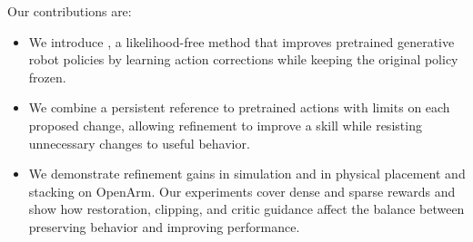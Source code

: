 Our contributions are:
\begin{itemize}
\item We introduce \method{}, a likelihood-free method that improves pretrained generative robot policies by learning action corrections while keeping the original policy frozen.
\item We combine a persistent reference to pretrained actions with limits on each proposed change, allowing refinement to improve a skill while resisting unnecessary changes to useful behavior.
\item We demonstrate refinement gains in simulation and in physical placement and stacking on OpenArm. Our experiments cover dense and sparse rewards and show how restoration, clipping, and critic guidance affect the balance between preserving behavior and improving performance.
\end{itemize}

